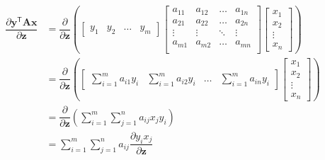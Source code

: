 \documentclass{article}
\newcommand{\trans}{\mathsf{T}}
\begin{document}
\begin{align}
    \dfrac{\partial \mathbf{y}^\trans \mathbf{A} \mathbf{x}}{\partial \mathbf{z}} &= \dfrac{\partial}{\partial \mathbf{z}} \left(
    \begin{bmatrix}
        y_{1} & y_{2} & \dots & y_{m}
    \end{bmatrix}
    \begin{bmatrix}
        a_{11} & a_{12} & \dots & a_{1n} \\
        a_{21} & a_{22} & \dots & a_{2n} \\
        \vdots & \vdots & \ddots & \vdots \\
        a_{m1} & a_{m2} & \dots & a_{mn} \\
    \end{bmatrix} \begin{bmatrix}
        x_{1} \\ x_{2} \\ \vdots \\ x_{n}
    \end{bmatrix} \right) \\
    &= \dfrac{\partial}{\partial \mathbf{z}} \left(
			\begin{bmatrix}
				\displaystyle \sum_{i = 1}^{m} a_{i1}y_{i} & 
				\displaystyle \sum_{i = 1}^{m} a_{i2}y_{i} & 
				\dots & 
				\displaystyle \sum_{i = 1}^{m} a_{in}y_{i}
			\end{bmatrix} \begin{bmatrix}
				x_{1} \\ x_{2} \\ \vdots \\ x_{n}
			\end{bmatrix} \right) \\
    &= \dfrac{\partial}{\partial \mathbf{z}} \left(
        \sum_{i = 1}^{m}\sum_{j = 1}^{n} a_{ij} x_{j} y_{i}
    \right) \\
    &= \sum_{i = 1}^{m}\sum_{j = 1}^{n} a_{ij} \dfrac{\partial y_{i}x_{j}}{\partial \mathbf{z}} %
\end{align}
\end{document}
